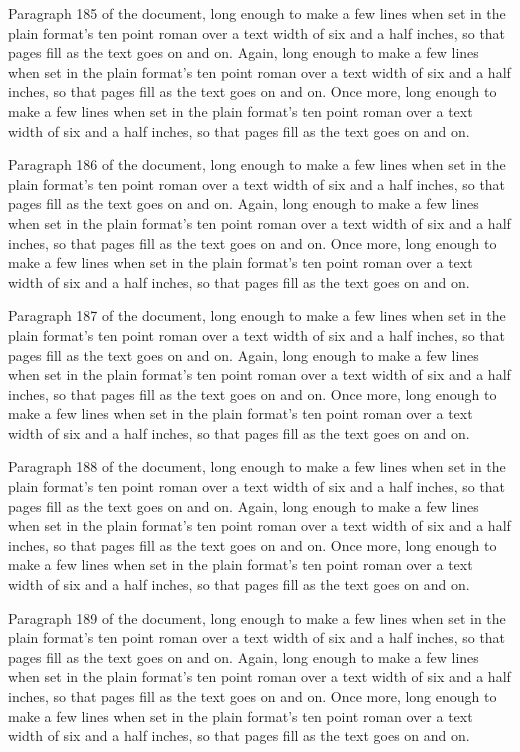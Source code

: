 Paragraph 185 of the document, long enough to make a few lines when set in the plain format's ten point roman over a text width of six and a half inches, so that pages fill as the text goes on and on. Again, long enough to make a few lines when set in the plain format's ten point roman over a text width of six and a half inches, so that pages fill as the text goes on and on. Once more, long enough to make a few lines when set in the plain format's ten point roman over a text width of six and a half inches, so that pages fill as the text goes on and on.

Paragraph 186 of the document, long enough to make a few lines when set in the plain format's ten point roman over a text width of six and a half inches, so that pages fill as the text goes on and on. Again, long enough to make a few lines when set in the plain format's ten point roman over a text width of six and a half inches, so that pages fill as the text goes on and on. Once more, long enough to make a few lines when set in the plain format's ten point roman over a text width of six and a half inches, so that pages fill as the text goes on and on.

Paragraph 187 of the document, long enough to make a few lines when set in the plain format's ten point roman over a text width of six and a half inches, so that pages fill as the text goes on and on. Again, long enough to make a few lines when set in the plain format's ten point roman over a text width of six and a half inches, so that pages fill as the text goes on and on. Once more, long enough to make a few lines when set in the plain format's ten point roman over a text width of six and a half inches, so that pages fill as the text goes on and on.

Paragraph 188 of the document, long enough to make a few lines when set in the plain format's ten point roman over a text width of six and a half inches, so that pages fill as the text goes on and on. Again, long enough to make a few lines when set in the plain format's ten point roman over a text width of six and a half inches, so that pages fill as the text goes on and on. Once more, long enough to make a few lines when set in the plain format's ten point roman over a text width of six and a half inches, so that pages fill as the text goes on and on.

Paragraph 189 of the document, long enough to make a few lines when set in the plain format's ten point roman over a text width of six and a half inches, so that pages fill as the text goes on and on. Again, long enough to make a few lines when set in the plain format's ten point roman over a text width of six and a half inches, so that pages fill as the text goes on and on. Once more, long enough to make a few lines when set in the plain format's ten point roman over a text width of six and a half inches, so that pages fill as the text goes on and on.

